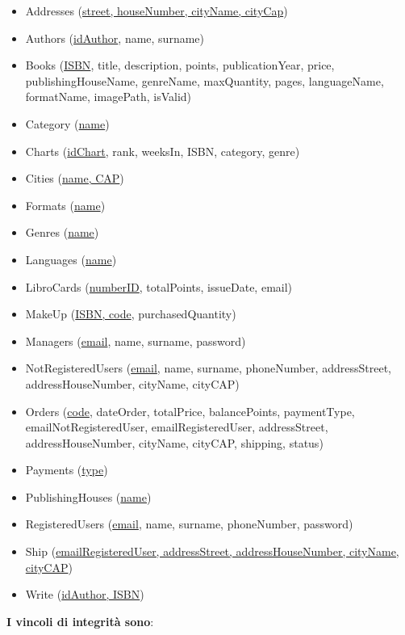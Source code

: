 \documentclass[a4paper,11pt]{report}
\begin{document}
\begin{itemize}
    \item Addresses (\ul{street, houseNumber, cityName, cityCap})
    \item Authors (\ul{idAuthor}, name, surname)
    \item Books (\ul{ISBN}, title, description, points, publicationYear, price, publishingHouseName, genreName, maxQuantity, pages, languageName, formatName, imagePath, isValid)
    \item Category (\ul{name})
    \item Charts (\ul{idChart}, rank, weeksIn, ISBN, category, genre)
    \item Cities (\ul{name, CAP})
    \item Formats (\ul{name})
    \item Genres (\ul{name})
    \item Languages (\ul{name})
    \item LibroCards (\ul{numberID}, totalPoints, issueDate, email)
    \item MakeUp (\ul{ISBN, code}, purchasedQuantity)
    \item Managers (\ul{email}, name, surname, password)
    \item NotRegisteredUsers (\ul{email}, name, surname, phoneNumber, addressStreet, addressHouseNumber, cityName, cityCAP)
    \item Orders (\ul{code}, dateOrder, totalPrice, balancePoints, paymentType, emailNotRegisteredUser, emailRegisteredUser, addressStreet, addressHouseNumber, cityName, cityCAP, shipping, status)
    \item Payments (\ul{type})
    \item PublishingHouses (\ul{name})
    \item RegisteredUsers (\ul{email}, name, surname, phoneNumber, password)
    \item Ship (\ul{emailRegisteredUser, addressStreet, addressHouseNumber, cityName, cityCAP})
    \item Write (\ul{idAuthor, ISBN})
\end{itemize}
\vspace{0.4in}

\textbf{I vincoli di integrità sono}:
\end{document}
